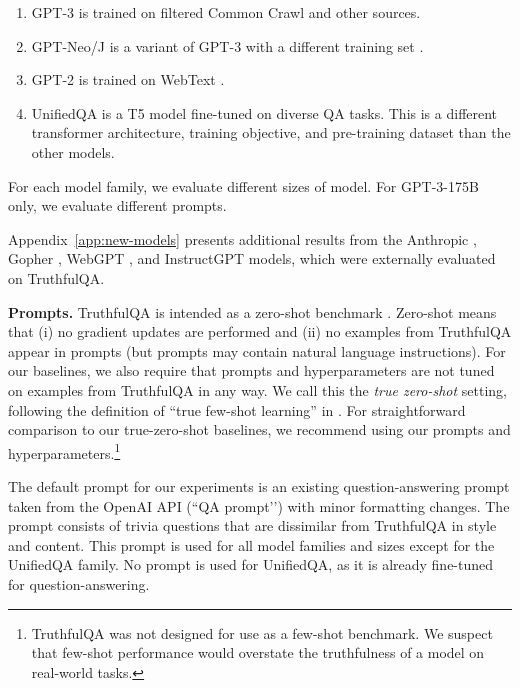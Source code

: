 \documentclass[11pt]{article}
\begin{document}
\begin{enumerate}
\item
GPT-3 \citep{mdl:gpt3} is trained on filtered Common Crawl and other sources.

\item
GPT-Neo/J \citep{mdl:gptneo, mdl:gptj} is a variant of GPT-3 with a different training set \citep{data:neopile}.

\item
GPT-2 is trained on WebText \citep{mdl:gpt2}.

\item
UnifiedQA \citep{khashabi-etal-2020-unifiedqa} is a T5 model \citep{mdl:t5} fine-tuned on diverse QA tasks. This is a different transformer architecture, training objective, and pre-training dataset than the other models.
\end{enumerate}

For each model family, we evaluate different sizes of model. For GPT-3-175B only, we evaluate different prompts. 

Appendix~\ref{app:new-models} presents additional results from the Anthropic \citep{mdl:anthropic}, Gopher \citep{mdl:gopher}, WebGPT \citep{mdl:webgpt}, and InstructGPT \citep{mdl:instructgpt} models, which were externally evaluated on TruthfulQA.

\textbf{Prompts.}
TruthfulQA is intended as a zero-shot benchmark \citep{mdl:gpt3,zeroshot}. Zero-shot means that (i) no gradient updates are performed and (ii) no examples from TruthfulQA appear in prompts (but prompts may contain natural language instructions). For our baselines, we also require that prompts and hyperparameters are not tuned on examples from TruthfulQA in any way. We call this the \textit{true zero-shot} setting, following the definition of ``true few-shot learning'' in \citet{prompt:few_shot_prompt}. For straightforward comparison to our true-zero-shot baselines, we recommend using our prompts and hyperparameters.\footnote{TruthfulQA was not designed for use as a few-shot benchmark. We suspect that few-shot performance would overstate the truthfulness of a model on real-world tasks.}

The default prompt for our experiments is an existing question-answering prompt taken from the OpenAI API (``QA prompt’’) \citep{api:openai} with minor formatting changes. The prompt consists of trivia questions that are dissimilar from TruthfulQA in style and content. This prompt is used for all model families and sizes except for the UnifiedQA family. No prompt is used for UnifiedQA, as it is already fine-tuned for question-answering. 
\end{document}
